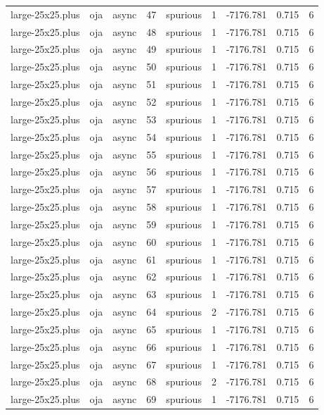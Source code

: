\begin{tabular}{lllrlrrrr}
large-25x25.plus & oja & async & 47 & spurious & 1 & -7176.781 & 0.715 & 6 \\
large-25x25.plus & oja & async & 48 & spurious & 1 & -7176.781 & 0.715 & 6 \\
large-25x25.plus & oja & async & 49 & spurious & 1 & -7176.781 & 0.715 & 6 \\
large-25x25.plus & oja & async & 50 & spurious & 1 & -7176.781 & 0.715 & 6 \\
large-25x25.plus & oja & async & 51 & spurious & 1 & -7176.781 & 0.715 & 6 \\
large-25x25.plus & oja & async & 52 & spurious & 1 & -7176.781 & 0.715 & 6 \\
large-25x25.plus & oja & async & 53 & spurious & 1 & -7176.781 & 0.715 & 6 \\
large-25x25.plus & oja & async & 54 & spurious & 1 & -7176.781 & 0.715 & 6 \\
large-25x25.plus & oja & async & 55 & spurious & 1 & -7176.781 & 0.715 & 6 \\
large-25x25.plus & oja & async & 56 & spurious & 1 & -7176.781 & 0.715 & 6 \\
large-25x25.plus & oja & async & 57 & spurious & 1 & -7176.781 & 0.715 & 6 \\
large-25x25.plus & oja & async & 58 & spurious & 1 & -7176.781 & 0.715 & 6 \\
large-25x25.plus & oja & async & 59 & spurious & 1 & -7176.781 & 0.715 & 6 \\
large-25x25.plus & oja & async & 60 & spurious & 1 & -7176.781 & 0.715 & 6 \\
large-25x25.plus & oja & async & 61 & spurious & 1 & -7176.781 & 0.715 & 6 \\
large-25x25.plus & oja & async & 62 & spurious & 1 & -7176.781 & 0.715 & 6 \\
large-25x25.plus & oja & async & 63 & spurious & 1 & -7176.781 & 0.715 & 6 \\
large-25x25.plus & oja & async & 64 & spurious & 2 & -7176.781 & 0.715 & 6 \\
large-25x25.plus & oja & async & 65 & spurious & 1 & -7176.781 & 0.715 & 6 \\
large-25x25.plus & oja & async & 66 & spurious & 1 & -7176.781 & 0.715 & 6 \\
large-25x25.plus & oja & async & 67 & spurious & 1 & -7176.781 & 0.715 & 6 \\
large-25x25.plus & oja & async & 68 & spurious & 2 & -7176.781 & 0.715 & 6 \\
large-25x25.plus & oja & async & 69 & spurious & 1 & -7176.781 & 0.715 & 6 \\

\end{tabular}
